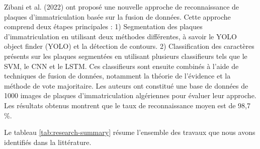 
Zibani et al. (2022) \cite{zibani} ont proposé une nouvelle approche de reconnaissance de plaques d'immatriculation basée sur la fusion de données. Cette approche comprend deux étapes principales : 1) Segmentation des plaques d'immatriculation en utilisant deux méthodes différentes, à savoir le YOLO object finder (YOLO) et la détection de contours. 2) Classification des caractères présents sur les plaques segmentées en utilisant plusieurs classifieurs tels que le SVM, le CNN et le LSTM. Ces classifieurs sont ensuite combinés à l'aide de techniques de fusion de données, notamment la théorie de l'évidence et la méthode de vote majoritaire. Les auteurs ont constitué une base de données de 1000 images de plaques d'immatriculation algériennes pour évaluer leur approche. Les résultats obtenus montrent que le taux de reconnaissance moyen est de 98,7 \%.


Le tableau \ref{tab:research-summary} résume l'ensemble des travaux que nous avons identifiés dans la littérature.

